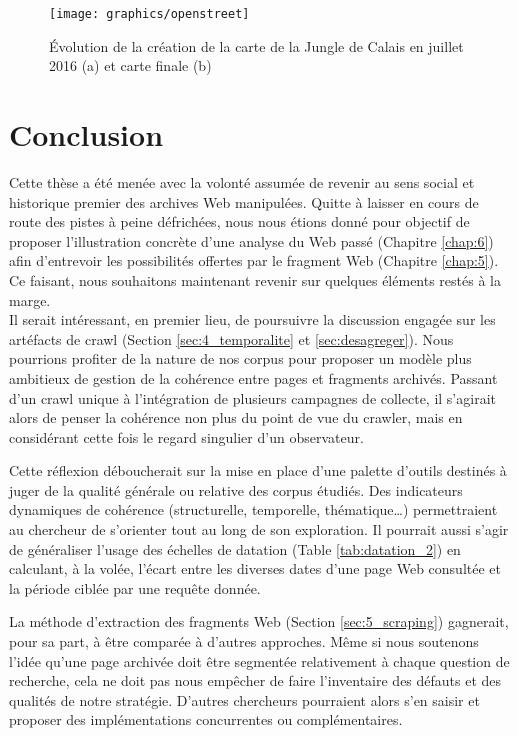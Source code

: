 \documentclass[symmetric,justified,marginals=raggedouter]{tufte-book}
\begin{document}
\begin{figure*}%
  \texttt{[image: graphics/openstreet]}
  \caption{Évolution de la création de la carte de la Jungle de Calais en juillet 2016 (a) et carte finale (b)}
  \label{fig:openstreet}
\end{figure*}     



\chapter*{Conclusion}

\noindent Cette thèse a été menée avec la volonté assumée de revenir au sens social et historique premier des archives Web manipulées. Quitte à laisser en cours de route des pistes à peine défrichées, nous nous étions donné pour objectif de proposer l'illustration concrète d'une analyse du Web passé (Chapitre \ref{chap:6}) afin d'entrevoir les possibilités offertes par le fragment Web (Chapitre \ref{chap:5}). Ce faisant, nous souhaitons maintenant revenir  sur quelques éléments restés à la marge.\\ 

\noindent Il serait intéressant, en premier lieu, de poursuivre la discussion engagée sur les artéfacts de crawl (Section \ref{sec:4_temporalite} et \ref{sec:desagreger}). Nous pourrions profiter de la nature de nos corpus pour proposer un modèle plus ambitieux de gestion de la cohérence entre pages et fragments archivés. Passant d'un crawl unique à l'intégration de plusieurs campagnes de collecte, il s'agirait alors de penser la cohérence non plus du point de vue du crawler, mais en considérant cette fois le regard singulier d'un observateur.

Cette réflexion déboucherait sur la mise en place d'une palette d'outils destinés à juger de la qualité générale ou relative des corpus étudiés. Des indicateurs dynamiques de cohérence (structurelle, temporelle, thématique\ldots{}) permettraient au chercheur de s'orienter tout au long de son exploration. Il pourrait aussi s'agir de généraliser l'usage des échelles de datation (Table \ref{tab:datation_2}) en calculant, à la volée, l'écart entre les diverses dates d'une page Web consultée et la période ciblée par une requête donnée.

La méthode d'extraction des fragments Web (Section \ref{sec:5_scraping}) gagnerait, pour sa part, à être comparée à d'autres approches. Même si nous soutenons l'idée qu'une page archivée doit être segmentée relativement à chaque question de recherche, cela ne doit pas nous empêcher de faire l'inventaire des défauts et des qualités de notre stratégie. D'autres chercheurs pourraient alors s'en saisir et proposer des implémentations concurrentes ou complémentaires.  
\end{document}
